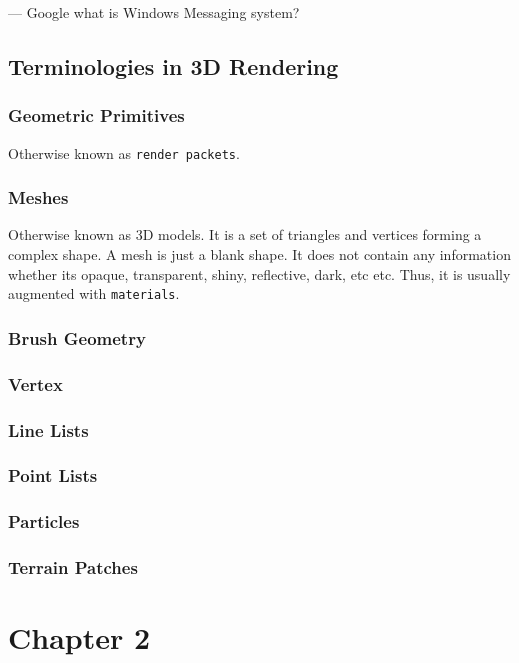 \documentclass[a4paper,12pt]{book}
\begin{document}
--- Google what is Windows Messaging system?

\subsection{Terminologies in 3D Rendering}

\subsubsection{Geometric Primitives}

Otherwise known as \texttt{render packets}.

\subsubsection{Meshes}

Otherwise known as 3D models.
It is a set of triangles and vertices forming a complex shape.
A mesh is just a blank shape.
It does not contain any information whether its opaque, transparent, shiny, reflective, dark, etc etc.
Thus, it is usually augmented with \texttt{materials}.

\subsubsection{Brush Geometry}

\subsubsection{Vertex}

\subsubsection{Line Lists}

\subsubsection{Point Lists}

\subsubsection{Particles}

\subsubsection{Terrain Patches}


\section{Chapter 2}
\end{document}
